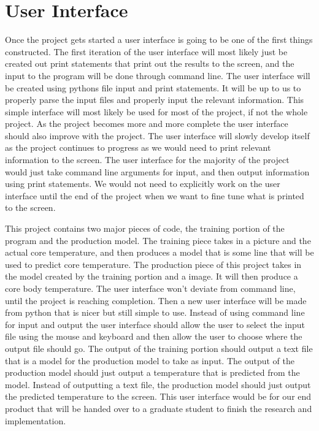﻿\documentclass[onecolumn, draftclsnofoot,10pt, compsoc]{IEEEtran}
\begin{document}
\section{User Interface}
Once the project gets started a user interface is going to be one of the first things constructed. The first iteration of the user interface will most likely just be created out print statements that print out the results to the screen, and the input to the program will be done through command line. The user interface will be created using pythons file input and print statements. It will be up to us to properly parse the input files and properly input the relevant information. This simple interface will most likely be used for most of the project, if not the whole project. As the project becomes more and more complete the user interface should also improve with the project. The user interface will slowly develop itself as the project continues to progress as we would need to print relevant information to the screen. The user interface for the majority of the project would just take command line arguments for input, and then output information using print statements. We would not need to explicitly work on the user interface until the end of the project when we want to fine tune what is printed to the screen.

This project contains two major pieces of code, the training portion of the program and the production model. The training piece takes in a picture and the actual core temperature, and then produces a model that is some line that will be used to predict core temperature. The production piece of this project takes in the model created by the training portion and a image. It will then produce a core body temperature. The user interface won’t deviate from command line, until the project is reaching completion. Then a new user interface will be made from python that is nicer but still simple to use. Instead of using command line for input and output the user interface should allow the user to select the input file using the mouse and keyboard and then allow the user to choose where the output file should go. The output of the training portion should output a text file that is a model for the production model to take as input. The output of the production model should just output a temperature that is predicted from the model. Instead of outputting a text file, the production model should just output the predicted temperature to the screen. This user interface would be for our end product that will be handed over to a graduate student to finish the research and implementation.
\end{document}
